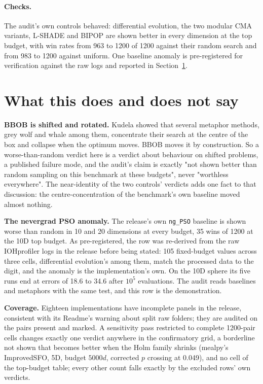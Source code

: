 \documentclass[11pt]{article}
\begin{document}
\paragraph{Checks.} The audit's own controls behaved: differential evolution, the two
modular CMA variants, L-SHADE and BIPOP are shown better in every dimension at the top budget, with win
rates from 963 to 1200 of 1200 against their random search and from 983 to 1200
against uniform. One baseline anomaly is
pre-registered for verification against the raw logs and reported in
Section~\ref{sec:threats}.

\section{What this does and does not say}\label{sec:threats}

\textbf{BBOB is shifted and rotated.} Kudela \cite{kudela} showed that several
metaphor methods, grey wolf and whale among them, concentrate their search at the centre
of the box and collapse when the optimum moves. BBOB moves it by construction. So a
worse-than-random verdict here is a verdict about behaviour on shifted problems, a
published failure mode, and the audit's claim is exactly "not shown better than random
sampling on this benchmark at these budgets", never "worthless everywhere". The
near-identity of the two controls' verdicts adds one fact to that discussion: the
centre-concentration of the benchmark's own baseline moved almost nothing.

\textbf{The nevergrad PSO anomaly.} The release's own \texttt{ng\_PSO} baseline is shown
worse than random in 10 and 20 dimensions at every budget, 35 wins of 1200 at the 10D
top budget. As pre-registered, the row was re-derived from the raw IOHprofiler logs in
the release before being stated: 105 fixed-budget values across three cells,
differential evolution's among them, match the processed data to the digit, and the
anomaly is the implementation's own. On the 10D sphere its five runs end at errors of
18.6 to 34.6 after $10^5$ evaluations. The audit reads baselines and metaphors with the
same test, and this row is the demonstration.

\textbf{Coverage.} Eighteen implementations have incomplete panels in the release,
consistent with its Readme's warning about split raw folders; they are audited on the
pairs present and marked. A sensitivity pass restricted to complete 1200-pair cells
changes exactly one verdict anywhere in the confirmatory grid, a borderline not shown
that becomes better when the Holm family shrinks (mealpy's ImprovedSFO, 5D, budget
$5000d$, corrected $p$ crossing at 0.049), and no cell of the top-budget table; every
other count falls exactly by the excluded rows' own verdicts.
\end{document}

